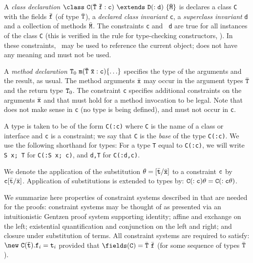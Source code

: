 A {\em class declaration} $\tt\class \ C(\bar{T}\ \bar{f}:c)\ \extends\ D(:d)\
\{\bar{M}\}$ is declares a class {\tt C} with the
fields $\bar{\tt f}$ (of type $\bar{\tt T}$), a {\em declared class
invariant} {\tt c}, a {\em superclass invariant} {\tt d} and a
collection of methods $\bar{\tt M}$. The constraints {\tt c} and {\tt
d} are true for all instances of the class {\tt C} (this is verified
in the rule for type-checking constructors, \rn{T-New}).  In these
constraints, \this\ may be used to reference the current object;
\self{} does not have any meaning and must not be used.

A {\em method declaration} ${\tt T}_0\ {\tt m(\bar{\tt T}\ \bar{\tt x} :
c)\{\ldots\}}$ specifies the type of the arguments and the result, as
usual.  The method arguments $\bar{\tt x}$ may occur in the argument
types $\bar{\tt T}$ and the return type ${\tt T}_0$.  The constraint
{\tt c} specifies additional constraints on the arguments $\bar{\tt
x}$ and
\this{} that must hold for a method invocation to be legal. Note that
\self{} does not make sense in {\tt c} (no type is being
defined), and must not occur in {\tt c}.

A type is taken to be of the form {\tt C(:c)} where {\tt C} is the
name of a class or interface and {\tt c} is a constraint; we say that
{\tt C} is the {\em base} of the type {\tt C(:c)}.
We use the following shorthand for types: For a
type {\tt T} equal to {\tt C(:c)}, we will write {\tt S\ x; T} for
{\tt C(:S\ x; c)}, and {\tt d,T} for {\tt C(:d,c)}.

We denote the application of the
substitution $\theta=[\bar{{\tt t}}/\bar{{\tt x}}]$ to a
constraint ${\tt c}$ by ${\tt c}[\bar{{\tt t}}/\bar{{\tt x}}]$. 
Application of substitutions is extended to
types by: ${\tt C(:c)\theta}={\tt C(:c\theta)}$.

We summarize here properties of constraint systems described in
\cite{CCCC} that are needed for the proofs: constraint systems may be
thought of as presented via an intuitionistic Gentzen proof system
supporting identity; affine and exchange on the left; existential
quantification and conjunction on the left and right; and closure
under substitution of terms.
%
All constraint systems are required to satisfy: $\new\ {\tt
C(\bar{\tt t})}.{\tt f}_i={\tt t}_i $ provided that
$\fields({\tt C})=\bar{\tt T}\ \bar{\tt f}$ (for some sequence
of types $\bar{\tt T}$).

